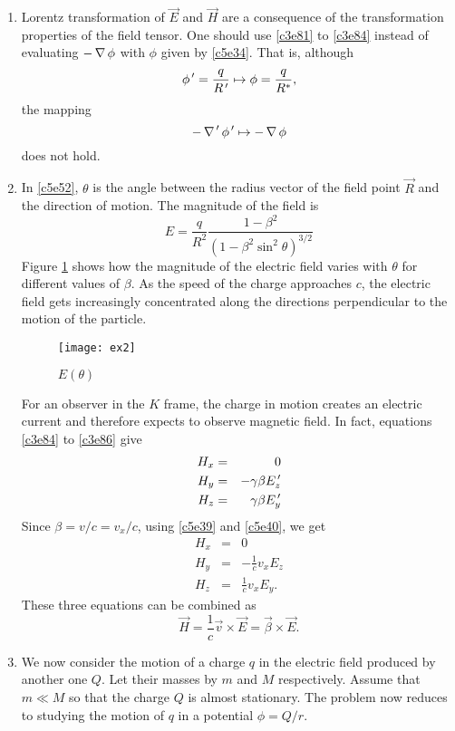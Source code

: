 \begin{enumerate}
\item Lorentz transformation of $\vec{E}$ and $\vec{H}$ are a consequence of the
transformation properties of the field tensor. One should use \eqref{c3e81} to
\eqref{c3e84} instead of evaluating $-\operatorname{\nabla}\phi$ with $\phi$ given by \eqref{c5e34}.
That is, although
\[
\phi^{\,\prime} = \frac{q}{R^{\,\prime}} \mapsto \phi = \frac{q}{R^\ast},
\]
the mapping
\[
-\operatorname{\nabla}^{\,\prime}\phi^{\,\prime} \mapsto -\operatorname{\nabla}\phi
\]
does not hold.

\item In \eqref{c5e52}, $\theta$ is the angle between the radius vector of the
field point $\vec{R}$ and the direction of motion. The magnitude of the field
is
\begin{equation}\label{c5e53}
E = \frac{q}{R^2}\frac{1 - \beta^2}{(1 - \beta^2\sin^2\theta)^{3/2}}
\end{equation}
Figure \ref{c5f1} shows how the magnitude of the electric field varies with 
$\theta$ for different values of $\beta$. As the speed of the charge approaches
$c$, the electric field gets increasingly concentrated along the directions
perpendicular to the motion of the particle.
\begin{figure}[!ht]
\texttt{[image: ex2]}
\caption{$E(\theta)$}
\label{c5f1}
\end{figure}
For an observer in the $K$ frame, the charge in motion creates an electric current
and therefore expects to observe magnetic field. In fact, equations \eqref{c3e84}
to \eqref{c3e86} give
\begin{eqnarray}
H_x &=& 0 \label{c5e54} \\
H_y &=& -\gamma\beta E^{\,\prime}_z \label{c5e55} \\
H_z &=& \gamma\beta E^{\,\prime}_y \label{c5e56}
\end{eqnarray}
Since $\beta = v/c = v_x/c$, using \eqref{c5e39} and \eqref{c5e40}, we get
\begin{eqnarray}
H_x &=& 0 \label{c5e57} \\
H_y &=& -\frac{1}{c}v_xE_z \label{c5e58} \\
H_z &=& \frac{1}{c}v_xE_y. \label{c5e59}
\end{eqnarray}
These three equations can be combined as
\begin{equation}\label{c5e60}
\vec{H} = \frac{1}{c}\vec{v} \times \vec{E} = \vec{\beta} \times \vec{E}.
\end{equation}

\item We now consider the motion of a charge $q$ in the electric field produced
by another one $Q$. Let their masses by $m$ and $M$ respectively. Assume that
$m \ll M$ so that the charge $Q$ is almost stationary. The problem now reduces to
studying the motion of $q$ in a potential $\phi = Q/r$.


\end{enumerate}
